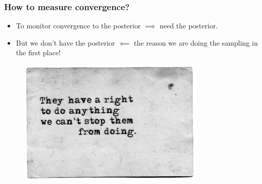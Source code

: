 \documentclass[handout]{beamer}
\begin{document}
\begin{frame}
\frametitle{How to measure convergence?}
\begin{itemize}
\item<2-> To monitor convergence to the posterior $\implies$ need the posterior.
\item<3-> But we don't have the posterior $\impliedby$ the reason we are doing the sampling in the first place!
\end{itemize}

\begin{figure}[ht]
\centerline{\includegraphics[width=0.8\textwidth]{./Figures/catch-22-quote.jpg}}
\end{figure}

\end{frame}
\end{document}
